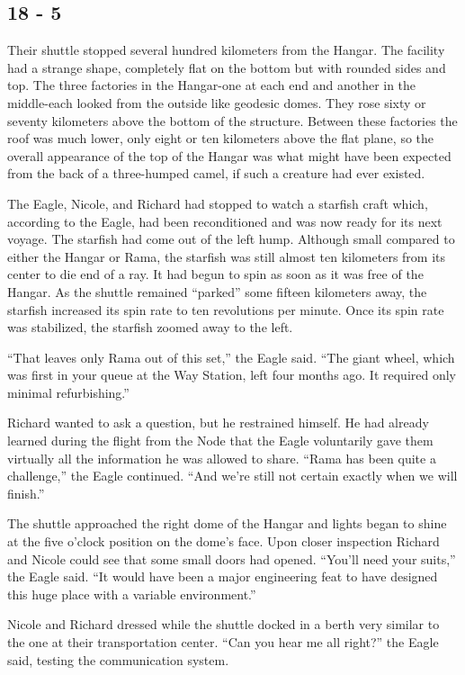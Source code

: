\documentclass[]{article}
\begin{document}
{\subsection*{18 - 5}

Their shuttle stopped several hundred kilometers from the Hangar.  The facility had a strange shape, completely flat on the bottom but with rounded sides and top.  The three factories in the Hangar-one at each end and another in the middle-each looked from the outside like geodesic domes.  They rose sixty or seventy kilometers above the bottom of the structure.  Between these factories the roof was much lower, only eight or ten kilometers above the flat plane, so the overall appearance of the top of the Hangar was what might have been expected from the back of a three-humped camel, if such a creature had ever existed.

The Eagle, Nicole, and Richard had stopped to watch a starfish craft which, according to the Eagle, had been reconditioned and was now ready for its next voyage.  The starfish had come out of the left hump.  Although small compared to either the Hangar or Rama, the starfish was still almost ten kilometers from its center to die end of a ray.  It had begun to spin as soon as it was free of the Hangar.  As the shuttle remained “parked” some fifteen kilometers away, the starfish increased its spin rate to ten revolutions per minute.  Once its spin rate was stabilized, the starfish zoomed away to the left.

“That leaves only Rama out of this set,” the Eagle said.  “The giant wheel, which was first in your queue at the Way Station, left four months ago.  It required only minimal refurbishing.”

Richard wanted to ask a question, but he restrained himself.  He had already learned during the flight from the Node that the Eagle voluntarily gave them virtually all the information he was allowed to share.  “Rama has been quite a challenge,” the Eagle continued.  “And we’re still not certain exactly when we will finish.”

The shuttle approached the right dome of the Hangar and lights began to shine at the five o’clock position on the dome’s face.  Upon closer inspection Richard and Nicole could see that some small doors had opened.  “You’ll need your suits,” the Eagle said.  “It would have been a major engineering feat to have designed this huge place with a variable environment.”

Nicole and Richard dressed while the shuttle docked in a berth very similar to the one at their transportation center.  “Can you hear me all right?” the Eagle said, testing the communication system.

}
\end{document}
